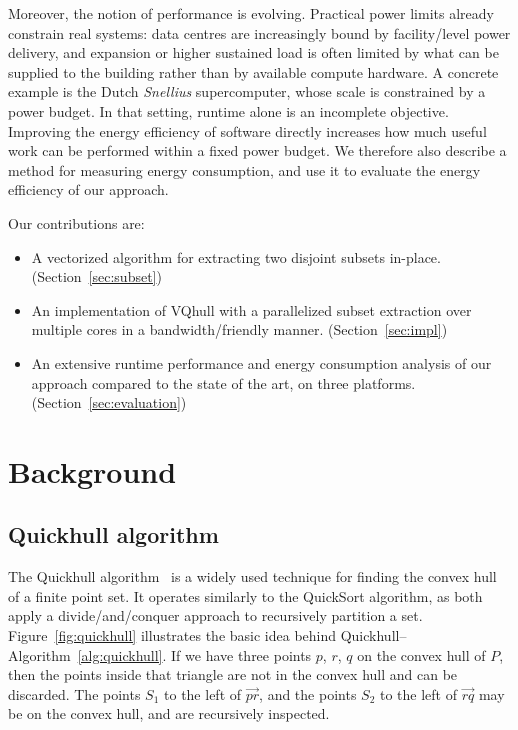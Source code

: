 Moreover, the notion of performance is evolving.
Practical power limits already constrain real systems: data centres are increasingly bound by facility\-/level power delivery, and expansion or higher sustained load is often limited by what can be supplied to the building rather than by available compute hardware.
A concrete example is the Dutch \emph{Snellius} supercomputer, whose scale is constrained by a power budget.
In that setting, runtime alone is an incomplete objective.
Improving the energy efficiency of software directly increases how much useful work can be performed within a fixed power budget.
We therefore also describe a method for measuring energy consumption, and use it to evaluate the energy efficiency of our approach.

Our contributions are:
\begin{itemize}
  \item A vectorized algorithm for extracting two disjoint subsets in-place.
  (Section~\ref{sec:subset})
  \item An implementation of VQhull with a parallelized subset extraction over multiple cores in a bandwidth\-/friendly manner.
  (Section~\ref{sec:impl})
  \item An extensive runtime performance and energy consumption analysis of our approach compared to the state of the art, on three platforms.
  (Section~\ref{sec:evaluation})
\end{itemize}

\section{Background}

\subsection{Quickhull algorithm}
The Quickhull algorithm~\cite{barber1996quick} is a widely used technique for finding the convex hull of a finite point set.
It operates similarly to the QuickSort algorithm, as both apply a divide\-/and\-/conquer approach to recursively partition a set.
Figure~\ref{fig:quickhull} illustrates the basic idea behind Quickhull\---Algorithm~\ref{alg:quickhull}.
If we have three points $p$, $r$, $q$ on the convex hull of $P$, then the points inside that triangle are not in the convex hull and can be discarded.
The points $S_1$ to the left of $\overrightarrow{pr}$, and the points $S_2$ to the left of $\overrightarrow{rq}$ may be on the convex hull, and are recursively inspected.


